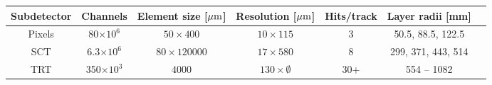 \begin{tabular}{c|cccccc}
  Subdetector & Channels           & Element size [$\mu\text{m}$] & Resolution [$\mu\text{m}$] & Hits/track & Layer radii [mm]   \\
  \hline
  Pixels      & 80$\times 10^{6}$  & $50 \times 400$          & $10 \times 115$        & 3          & 50.5, 88.5, 122.5  \\
  SCT         & 6.3$\times 10^{6}$ & $80 \times 120000$       & $17 \times 580$        & 8          & 299, 371, 443, 514 \\
  TRT         & 350$\times 10^{3}$ & $4000$                   & $130 \times \emptyset$ & 30+        & 554 -- 1082        \\
\end{tabular}

